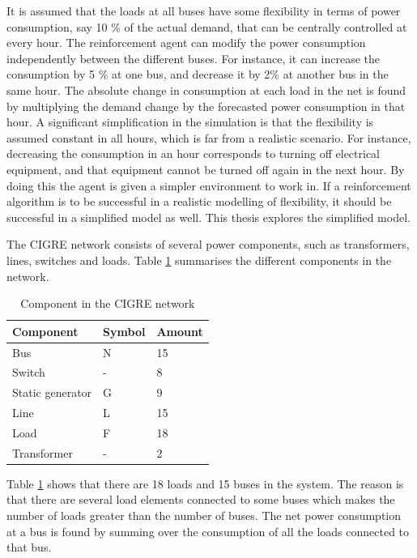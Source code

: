 \documentclass[class=book, crop=false, 11pt]{standalone}
\begin{document}
It is assumed that the loads at all buses have some flexibility in terms of power consumption, say 10 \% of the actual demand, that can be centrally controlled at every hour. The reinforcement agent can modify the power consumption independently between the different buses. For instance, it can increase the consumption by 5 \% at one bus, and decrease it by 2\% at another bus in the same hour. The absolute change in consumption at each load in the net is found by multiplying the demand change by the forecasted power consumption in that hour. A significant simplification in the simulation is that the flexibility is assumed constant in all hours, which is far from a realistic scenario. For instance, decreasing the consumption in an hour corresponds to turning off electrical equipment, and that equipment cannot be turned off again in the next hour. By doing this the agent is given a simpler environment to work in. If a reinforcement algorithm is to be successful in a realistic modelling of flexibility, it should be successful in a simplified model as well. This thesis explores the simplified model.

The CIGRE network consists of several power components, such as transformers, lines, switches and loads. Table \ref{table:cigre_components} summarises the different components in the network. 

\begin{table}[ht]
\centering
\caption{Component in the CIGRE network}
\label{table:cigre_components}
\begin{tabular}{l|ll}

Component  & Symbol & Amount 
\\ 
\hline
Bus & N & 15 \\
Switch & - & 8 \\
Static generator & G & 9 \\ 
Line & L & 15 \\
Load & F & 18 \\
Transformer &- & 2

 \\
\hline
\end{tabular}
\end{table}
Table \ref{table:cigre_components} shows that there are 18 loads and 15 buses in the system. The reason is that there are several load elements connected to some buses which makes the number of loads greater than the number of buses. The net power consumption at a bus is found by summing over the consumption of all the loads connected to that bus. 
\end{document}
